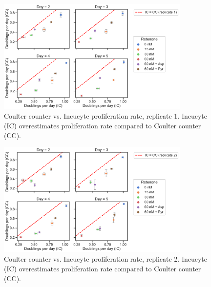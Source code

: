 \begin{figure}[ht]
    \centering
    \includegraphics[width=0.85\textwidth]{figures/sapp/IC/prlfr_ICvsCC-rep1-byday.pdf}
    \caption[Coulter counter vs. Incucyte proliferation rate, replicate 1.]{
    Coulter counter vs. Incucyte proliferation rate, replicate 1.
    Incucyte (IC) overestimates proliferation rate compared to Coulter counter (CC).
    }
    \label{fig:sapp:IC:ICvsCC1}
\end{figure}

\begin{figure}[ht]
    \centering
    \includegraphics[width=0.85\textwidth]{figures/sapp/IC/prlfr_ICvsCC-rep2-byday.pdf}
    \caption[Coulter counter vs. Incucyte proliferation rate, replicate 2.]{
    Coulter counter vs. Incucyte proliferation rate, replicate 2.
    Incucyte (IC) overestimates proliferation rate compared to Coulter counter (CC).
    }
    \label{fig:sapp:IC:ICvsCC2}
\end{figure}

